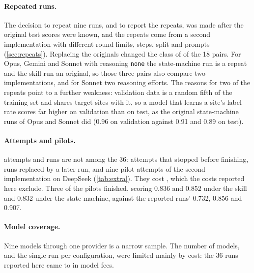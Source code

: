 \paragraph{Repeated runs.} The decision to repeat nine runs, and to report the repeats, was made after the original
test scores were known, and the repeats come from a second implementation with different round limits, steps, split
and prompts (\cref{sec:repeats}). Replacing the originals changed the class of \ChangedPairs{} of the 18 pairs. For
Opus, Gemini and Sonnet with reasoning \texttt{none} the state-machine run is a repeat and the skill run an original,
so those three pairs also compare two implementations, and for Sonnet two reasoning efforts. The reasons for two of
the repeats point to a further weakness: validation data is a random fifth of the training set and shares target sites
with it, so a model that learns a site's label rate scores far higher on validation than on test, as the original
state-machine runs of Opus and Sonnet did (0.96 on validation against 0.91 and 0.89 on test).

\paragraph{Attempts and pilots.} \ExtraCount{} attempts and runs are not among the 36: attempts that stopped before
finishing, runs replaced by a later run, and nine pilot attempts of the second implementation on DeepSeek
(\cref{tab:extra}). They cost \ExtraCost{}, which the costs reported here exclude. Three of the pilots finished,
scoring 0.836 and 0.852 under the skill and 0.832 under the state machine, against the reported runs' 0.732, 0.856 and
0.907.

\paragraph{Model coverage.} Nine models through one provider is a narrow sample. The number of models, and the single
run per configuration, were limited mainly by cost: the 36 runs reported here came to \RunsCost{} in model fees.

